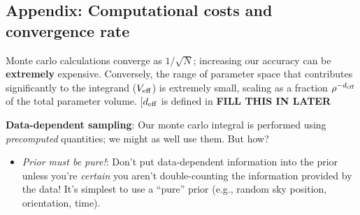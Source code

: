 \documentclass[twocolumn,prd,nofootinbib]{revtex4}
\newcommand\ForRichardOnly[1]{}
\begin{document}
\begin{widetext}
\ForRichardOnly{
\subsection{Discussion: what could we do for speed? (*)}


* clever likelihood evaluation (e.g., chunk the likeihood into time-frequency bins, and taper between bins? Good idea,
LOTS of infrastructure: basically wavelet-basis idea.  Or just use \textbf{two} time-frequency bins: 64 sec close to the
source and anything before 64 sec at a lower sample rate (256 Hz?).  Potentially dangerous for higher harmonics)

* Reject extremely low likelihoods early on: if the log likelihood is very close to zero at the FFT stage for any modes,
don't bother.  [This hopefully should never happen, if our intrinsic search is good.]
}



\subsection{Appendix: Computational costs and convergence rate}
Monte carlo calculations converge as $1/\sqrt{N}$; increasing our accuracy can be \textbf{extremely} expensive.  
%
Conversely, the range of parameter space that contributes significantly to the integrand ($V_{\rm eff}$) is extremely
small, scaling as a fraction $\rho^{-d_{\rm eff}}$ of the total parameter volume.  [$d_{\rm eff}$ is defined in \cite{gwastro-mergers-HeeSuk-CompareToPE-Aligned}
\textbf{FILL THIS IN LATER}


\begin{shaded}
\noindent \textbf{Data-dependent sampling}: Our monte carlo integral is performed using \emph{precomputed} quantities;
we might as well use them.  But how?
\begin{itemize}
\item \emph{Prior must be pure!}: Don't put data-dependent information into the prior unless  you're \emph{certain} you
  aren't double-counting the information provided by the data! It's simplest to use a ``pure'' prior (e.g., random sky
  position, orientation, time).


\end{itemize}
\end{shaded}
\end{widetext}
\end{document}

